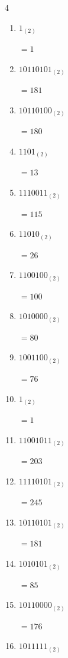 \begin{multicols}{4}
\begin{enumerate}
        $=169$

  \item $1_{(2)}$

        $=1$

  \item $10110101_{(2)}$

        $=181$

  \item $10110100_{(2)}$

        $=180$

  \item $1101_{(2)}$

        $=13$

  \item $1110011_{(2)}$

        $=115$

  \item $11010_{(2)}$

        $=26$

  \item $1100100_{(2)}$

        $=100$

  \item $1010000_{(2)}$

        $=80$

  \item $1001100_{(2)}$

        $=76$

  \item $1_{(2)}$

        $=1$

  \item $11001011_{(2)}$

        $=203$

  \item $11110101_{(2)}$

        $=245$

\columnbreak %

  \item $10110101_{(2)}$

        $=181$

  \item $1010101_{(2)}$

        $=85$

  \item $10110000_{(2)}$

        $=176$

  \item $1011111_{(2)}$


\end{enumerate}
\end{multicols}
